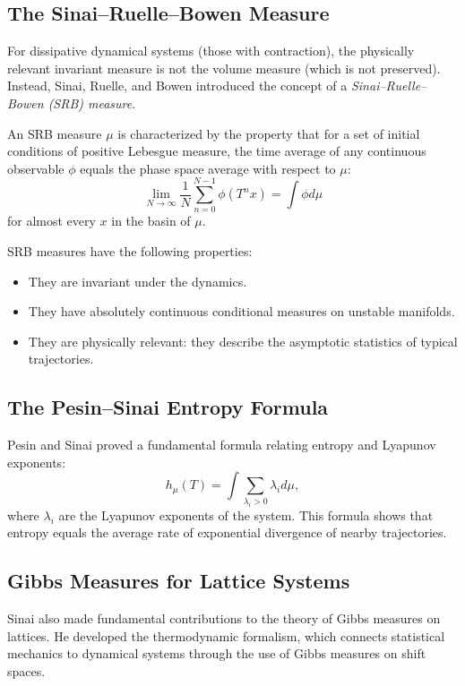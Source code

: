 \subsection{The Sinai--Ruelle--Bowen Measure}

For dissipative dynamical systems (those with contraction), the physically relevant invariant measure is not the volume measure (which is not preserved). Instead, Sinai, Ruelle, and Bowen introduced the concept of a \emph{Sinai--Ruelle--Bowen (SRB) measure}.

An SRB measure $\mu$ is characterized by the property that for a set of initial conditions of positive Lebesgue measure, the time average of any continuous observable $\phi$ equals the phase space average with respect to $\mu$:
\[
\lim_{N\to\infty} \frac{1}{N}\sum_{n=0}^{N-1} \phi(T^n x) = \int \phi d\mu
\]
for almost every $x$ in the basin of $\mu$.

SRB measures have the following properties:
\begin{itemize}
\item They are invariant under the dynamics.
\item They have absolutely continuous conditional measures on unstable manifolds.
\item They are physically relevant: they describe the asymptotic statistics of typical trajectories.
\end{itemize}

\subsection{The Pesin--Sinai Entropy Formula}

Pesin and Sinai proved a fundamental formula relating entropy and Lyapunov exponents:
\[
h_\mu(T) = \int \sum_{\lambda_i > 0} \lambda_i d\mu,
\]
where $\lambda_i$ are the Lyapunov exponents of the system. This formula shows that entropy equals the average rate of exponential divergence of nearby trajectories.

\subsection{Gibbs Measures for Lattice Systems}

Sinai also made fundamental contributions to the theory of Gibbs measures on lattices. He developed the thermodynamic formalism, which connects statistical mechanics to dynamical systems through the use of Gibbs measures on shift spaces.

